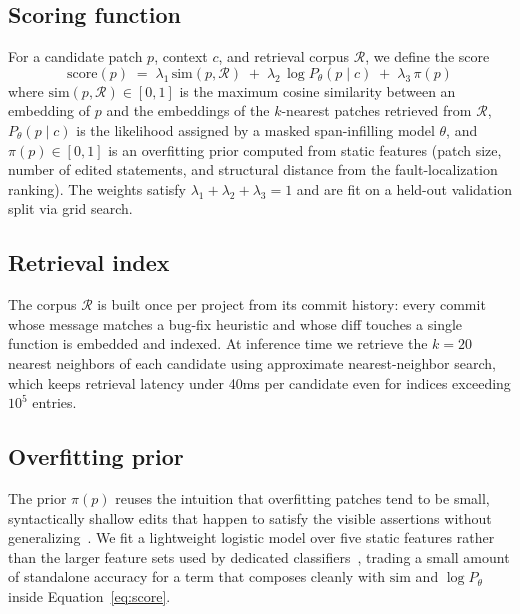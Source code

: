 \subsection{Scoring function}
For a candidate patch $p$, context $c$, and retrieval corpus $\mathcal{R}$, we define the score
\begin{equation}
\label{eq:score}
\mathrm{score}(p) \;=\; \lambda_1\,\mathrm{sim}(p,\mathcal{R}) \;+\; \lambda_2\,\log P_{\theta}(p \mid c) \;+\; \lambda_3\,\pi(p)
\end{equation}
where $\mathrm{sim}(p,\mathcal{R}) \in [0,1]$ is the maximum cosine similarity between an embedding of $p$ and the embeddings of the $k$-nearest patches retrieved from $\mathcal{R}$, $P_{\theta}(p\mid c)$ is the likelihood assigned by a masked span-infilling model $\theta$, and $\pi(p) \in [0,1]$ is an overfitting prior computed from static features (patch size, number of edited statements, and structural distance from the fault-localization ranking). The weights satisfy $\lambda_1 + \lambda_2 + \lambda_3 = 1$ and are fit on a held-out validation split via grid search.

\subsection{Retrieval index}
The corpus $\mathcal{R}$ is built once per project from its commit history: every commit whose message matches a bug-fix heuristic and whose diff touches a single function is embedded and indexed. At inference time we retrieve the $k{=}20$ nearest neighbors of each candidate using approximate nearest-neighbor search, which keeps retrieval latency under 40ms per candidate even for indices exceeding $10^5$ entries.

\subsection{Overfitting prior}
The prior $\pi(p)$ reuses the intuition that overfitting patches tend to be small, syntactically shallow edits that happen to satisfy the visible assertions without generalizing~\cite{oyelaran2020overfitting}. We fit a lightweight logistic model over five static features rather than the larger feature sets used by dedicated classifiers~\cite{alvarez2019classifier}, trading a small amount of standalone accuracy for a term that composes cleanly with $\mathrm{sim}$ and $\log P_\theta$ inside Equation~\ref{eq:score}.
